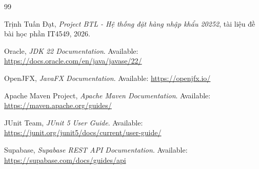 \begin{thebibliography}{99}

Trịnh Tuấn Đạt, \textit{Project BTL - Hệ thống đặt hàng nhập khẩu 20252}, tài liệu đề bài học phần IT4549, 2026.

Oracle, \textit{JDK 22 Documentation}. Available: \url{https://docs.oracle.com/en/java/javase/22/}

OpenJFX, \textit{JavaFX Documentation}. Available: \url{https://openjfx.io/}

Apache Maven Project, \textit{Apache Maven Documentation}. Available: \url{https://maven.apache.org/guides/}

JUnit Team, \textit{JUnit 5 User Guide}. Available: \url{https://junit.org/junit5/docs/current/user-guide/}

Supabase, \textit{Supabase REST API Documentation}. Available: \url{https://supabase.com/docs/guides/api}

\end{thebibliography}
